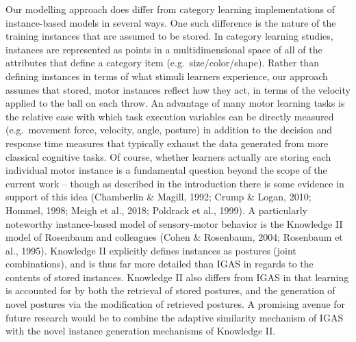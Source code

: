 \documentclass[
  man,floatsintext]{apa7}
\begin{document}
Our modelling approach does differ from category learning implementations of instance-based models in several ways. One such difference is the nature of the training instances that are assumed to be stored. In category learning studies, instances are represented as points in a multidimensional space of all of the attributes that define a category item (e.g.~size/color/shape). Rather than defining instances in terms of what stimuli learners experience, our approach assumes that stored, motor instances reflect how they act, in terms of the velocity applied to the ball on each throw. An advantage of many motor learning tasks is the relative ease with which task execution variables can be directly measured (e.g.~movement force, velocity, angle, posture) in addition to the decision and response time measures that typically exhaust the data generated from more classical cognitive tasks. Of course, whether learners actually are storing each individual motor instance is a fundamental question beyond the scope of the current work -- though as described in the introduction there is some evidence in support of this idea (Chamberlin \& Magill, 1992; Crump \& Logan, 2010; Hommel, 1998; Meigh et al., 2018; Poldrack et al., 1999). A particularly noteworthy instance-based model of sensory-motor behavior is the Knowledge II model of Rosenbaum and colleagues (Cohen \& Rosenbaum, 2004; Rosenbaum et al., 1995). Knowledge II explicitly defines instances as postures (joint combinations), and is thus far more detailed than IGAS in regards to the contents of stored instances. Knowledge II also differs from IGAS in that learning is accounted for by both the retrieval of stored postures, and the generation of novel postures via the modification of retrieved postures. A promising avenue for future research would be to combine the adaptive similarity mechanism of IGAS with the novel instance generation mechanisms of Knowledge II.
\end{document}
